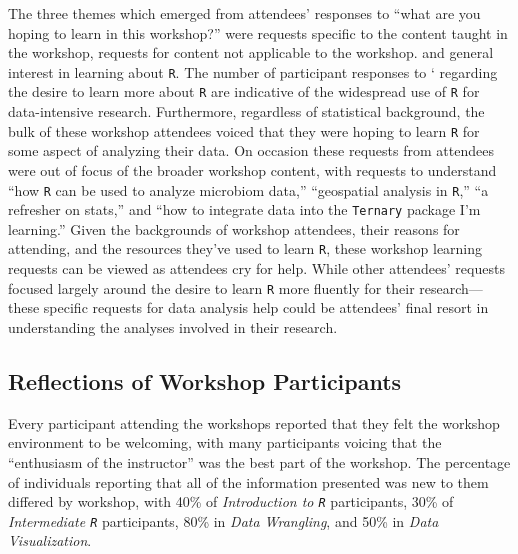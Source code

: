 \documentclass[12pt]{article}
\begin{document}
\quad The three themes which emerged from attendees' responses to ``what are you hoping to learn in this workshop?''  were requests specific to the content taught in the workshop, requests for content not applicable to the workshop. and general interest in learning about \texttt{R}. The number of participant responses to ` regarding the desire to learn more about \texttt{R} are indicative of the widespread use of \texttt{R} for data-intensive research. Furthermore, regardless of statistical background, the bulk of these workshop attendees voiced that they were hoping to learn \texttt{R} for some aspect of analyzing their data. On occasion these requests from attendees were out of focus of the broader workshop content, with requests to understand ``how \texttt{R} can be used to analyze microbiom data,'' ``geospatial analysis in \texttt{R},'' ``a refresher on stats,'' and ``how to integrate data into the \texttt{Ternary} package I'm learning.'' Given the backgrounds of workshop attendees, their reasons for attending, and the resources they've used to learn \texttt{R}, these workshop learning requests can be viewed as attendees cry for help. While other attendees' requests focused largely around the desire to learn \texttt{R} more fluently for their research---these specific requests for data analysis help could be attendees' final resort in understanding the analyses involved in their research.  

\subsection{Reflections of Workshop Participants} 

 \quad Every participant attending the workshops reported that they felt the workshop environment to be welcoming, with many participants voicing that the ``enthusiasm of the instructor'' was the best part of the workshop. The percentage of individuals reporting that all of the information presented was new to them differed by workshop, with 40\% of \emph{Introduction to \texttt{R}} participants, 30\% of \emph{Intermediate \texttt{R}} participants, 80\% in \emph{Data Wrangling}, and 50\% in \emph{Data Visualization}.
 
\end{document}
